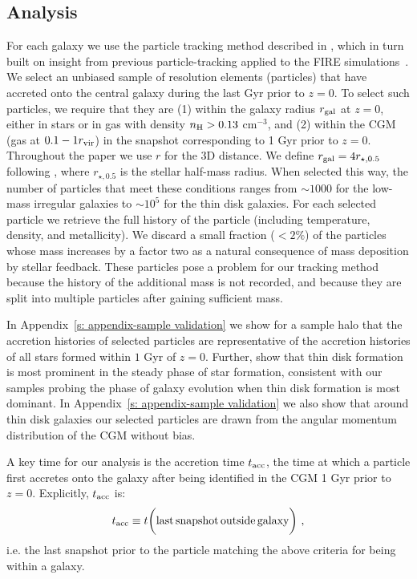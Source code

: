 \documentclass[fleqn,usenatbib]{mnras}
\newcommand{\tacc}{t_{\rm acc}}
\newcommand{\Rvir}{r_{\rm vir}}
\begin{document}
\subsection{Analysis}
\label{s: methods -- analysis}

For each galaxy we use the particle tracking method described in \cite{Hafen2019, Hafen2020}, which in turn built on insight from previous particle-tracking applied to the FIRE simulations~\citep{Angles-Alcazar2017}.
We select an unbiased sample of resolution elements (particles) that have accreted onto the central galaxy during the last Gyr prior to $z=0$.
To select such particles, we require that they are
(1) within the galaxy radius $r_{\rm gal}$ at $z=0$, either in stars or in gas with density  $n_{\rm H} > 0.13$ cm$^{-3}$, and
(2) within the CGM (gas at $0.1 - 1 \Rvir$) in the snapshot corresponding to 1 Gyr prior to $z=0$.
Throughout the paper we use $r$ for the 3D distance. 
We define $r_{\rm gal} = 4 r_{\star,0.5}$ following \cite{Hafen2019, Hafen2020}, where $r_{\star, 0.5}$ is the stellar half-mass radius.
When selected this way, the number of particles that meet these conditions ranges from $\sim 1000$ for the low-mass irregular galaxies to $\sim 10^5$ for the thin disk galaxies.
For each selected particle we retrieve the full history of the particle (including temperature, density, and metallicity). 
We discard a small fraction ($<2\%$) of the particles whose mass increases by a factor two as a natural consequence of mass deposition by stellar feedback.
These particles pose a problem for our tracking method because the history of the additional mass is not recorded, and because they are split into multiple particles after gaining sufficient mass.

In Appendix~\ref{s: appendix-sample validation} we show for a sample halo that the accretion histories of selected particles are representative of the accretion histories of all stars formed within $1$ Gyr of $z=0$.
Further, \cite{Yu2021} show that thin disk formation is most prominent in the steady phase of star formation, consistent with our samples probing the phase of galaxy evolution when thin disk formation is most dominant.
In Appendix~\ref{s: appendix-sample validation} we also show that around thin disk galaxies our selected particles are drawn from the angular momentum distribution of the CGM without bias.

A key time for our analysis is the accretion time $\tacc$, the time at which a particle first accretes onto the galaxy after being identified in the CGM 1 Gyr prior to $z=0$.
Explicitly, $\tacc$ is:
\begin{equation}
    \tacc \equiv t \bigg( {\rm last\,snapshot\,outside\,galaxy} \bigg) ~,
\label{e: tacc}
\end{equation}
i.e. the last snapshot prior to the particle matching the above criteria for being within a galaxy.
\end{document}
